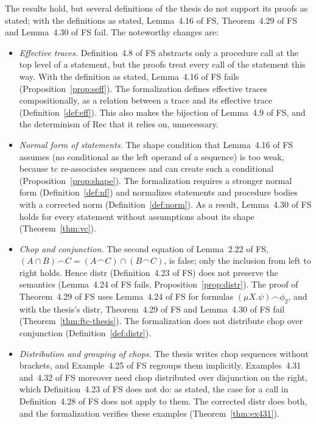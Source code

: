 \documentclass[11pt]{article}
\newcommand{\chop}{\smallfrown}
\newcommand{\tc}{\mathrm{tc}}
\newcommand{\distr}{\mathrm{distr}}
\newcommand{\norm}{\mathrm{norm}}
\newcommand{\Th}[1]{#1 of FS}
\theoremstyle{plain}
\theoremstyle{definition}
\theoremstyle{remark}
\begin{document}
The results hold, but several definitions of the thesis do not support its
proofs as stated; with the definitions as stated, \Th{Lemma~4.16},
\Th{Theorem~4.29} and \Th{Lemma~4.30} fail. The noteworthy changes are:
\begin{itemize}
\item \emph{Effective traces.} \Th{Definition~4.8} abstracts only a
  procedure call at the top level of a statement, but the proofs treat every
  call of the statement this way. With the definition as stated,
  \Th{Lemma~4.16} fails (Proposition~\ref{prop:seff}). The formalization
  defines effective traces compositionally, as a relation between a trace
  and its effective trace (Definition~\ref{def:eff}). This also makes the
  bijection of \Th{Lemma~4.9}, and the determinism of Rec that it relies
  on, unnecessary.
\item \emph{Normal form of statements.} The shape condition that
  \Th{Lemma~4.16} assumes (no conditional as the left operand of a
  sequence) is too weak, because $\tc$ re-associates sequences and can
  create such a conditional (Proposition~\ref{prop:shape}). The
  formalization requires a stronger normal form
  (Definition~\ref{def:nf}) and normalizes statements and procedure bodies
  with a corrected $\norm$ (Definition~\ref{def:norm}). As a result,
  \Th{Lemma~4.30} holds for every statement without assumptions about its
  shape (Theorem~\ref{thm:vc}).
\item \emph{Chop and conjunction.} The second equation of \Th{Lemma~2.22},
  $(A \cap B)\chop C = (A\chop C) \cap (B\chop C)$, is false; only the
  inclusion from left to right holds. Hence $\distr$ (\Th{Definition~4.23})
  does not preserve the semantics (\Th{Lemma~4.24} fails,
  Proposition~\ref{prop:distr}). The proof of \Th{Theorem~4.29} uses
  \Th{Lemma~4.24} for formulas $(\mu X.\psi)\chop\phi_2$, and with the
  thesis's $\distr$, \Th{Theorem~4.29} and \Th{Lemma~4.30} fail
  (Theorem~\ref{thm:ftc-thesis}). The formalization does not distribute
  chop over conjunction (Definition~\ref{def:distr}).
\item \emph{Distribution and grouping of chops.} The thesis writes chop
  sequences without brackets, and \Th{Example~4.25} regroups them
  implicitly. \Th{Examples~4.31 and~4.32} moreover need chop distributed
  over disjunction on the right, which \Th{Definition~4.23} does not do:
  as stated, the case for a call in \Th{Definition~4.28} does not apply
  to them. The corrected $\distr$ does both, and the formalization verifies
  these examples (Theorem~\ref{thm:ex431}).

\end{itemize}
\end{document}
